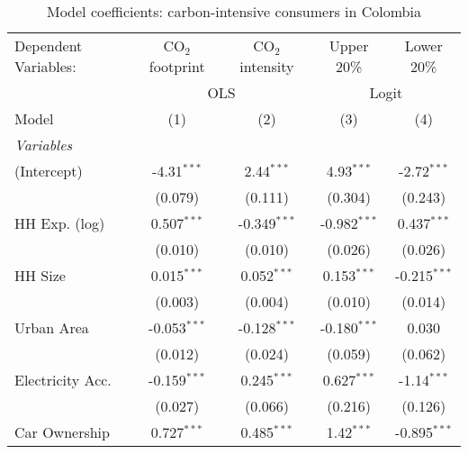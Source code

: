 
\begin{table}[htbp!]
   \centering
   \small
   \begin{adjustbox}{width = 1\textwidth, max height = 0.95\textheight, center}
      \begin{threeparttable}[b]
         \caption{\label{tab:Logit_1_COL} Model coefficients: carbon-intensive consumers in Colombia}
         \begin{tabular}{lcccc}
            \tabularnewline \midrule \midrule
            Dependent Variables: & CO$_{2}$ footprint & CO$_{2}$ intensity & Upper 20\%     & Lower 20\%\\   
             & \multicolumn{2}{c}{OLS} & \multicolumn{2}{c}{Logit} \\ 
            Model                & (1)                & (2)                & (3)            & (4)\\  
            \midrule
            \emph{Variables}\\
            (Intercept)          & -4.31$^{***}$      & 2.44$^{***}$       & 4.93$^{***}$   & -2.72$^{***}$\\   
                                 & (0.079)            & (0.111)            & (0.304)        & (0.243)\\   
            HH Exp. (log)        & 0.507$^{***}$      & -0.349$^{***}$     & -0.982$^{***}$ & 0.437$^{***}$\\   
                                 & (0.010)            & (0.010)            & (0.026)        & (0.026)\\   
            HH Size              & 0.015$^{***}$      & 0.052$^{***}$      & 0.153$^{***}$  & -0.215$^{***}$\\   
                                 & (0.003)            & (0.004)            & (0.010)        & (0.014)\\   
            Urban Area           & -0.053$^{***}$     & -0.128$^{***}$     & -0.180$^{***}$ & 0.030\\   
                                 & (0.012)            & (0.024)            & (0.059)        & (0.062)\\   
            Electricity Acc.     & -0.159$^{***}$     & 0.245$^{***}$      & 0.627$^{***}$  & -1.14$^{***}$\\   
                                 & (0.027)            & (0.066)            & (0.216)        & (0.126)\\   
            Car Ownership        & 0.727$^{***}$      & 0.485$^{***}$      & 1.42$^{***}$   & -0.895$^{***}$\\   

\end{tabular}
\end{threeparttable}
\end{adjustbox}
\end{table}
